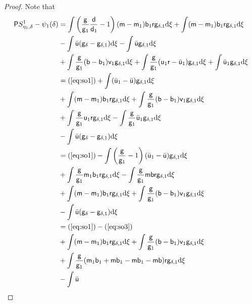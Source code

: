 \begin{proof} Note that
\begin{equation}
  \begin{split}
    \P S_{\eta_1,\delta}^1 -
    \psi_1(\delta)
    & =
      \int\left(\frac{\g}{\g_1}\frac{\d}{\d_1}
      - 1\right)(\m-\m_1)\b_1\r\g_{\delta,1}\dd\xi
      + \int(\m-\m_1)\b_1\r\g_{\delta,1}\dd\xi                                  \\
    & - \int\bar\uu
      (\g_\delta - \g_{\delta,1})\dd\xi - \int \bar\uu
      \g_{\delta,1}\dd\xi                                                       \\
    & +\int
      \frac{\g}{\g_1}(\b-\b_1)\vv_1\g_{\delta,1}\dd\xi
      + \int
      \frac{\g}{\g_1}(\uu_1\r-\bar\uu_1)\g_{\delta,1}\dd\xi
      +\int\bar\uu_1\g_{\delta,1}\dd\xi                                         \\
    & =(\ref{eq:so1})
      +\int (\bar\uu_1-\bar\uu)\g_{\delta,1}\dd\xi                              \\
    & +\int(\m-\m_1)\b_1\r\g_{\delta,1}\dd\xi +
      \int\frac{\g}{\g_1}(\b-\b_1)\vv_1\g_{\delta,1}\dd\xi                      \\
    & + \int
      \frac{\g}{\g_1}\uu_1\r\g_{\delta,1}\dd\xi
      -\int
      \frac{\g}{\g_1}\bar\uu_1\g_{\delta,1}\dd\xi                               \\
    & - \int\bar\uu
      (\g_\delta - \g_{\delta,1})\dd\xi           \\
    & =(\ref{eq:so1})
      -\int\left(\frac{\g}{\g_1}-1\right)(\bar\uu_1-\bar\uu)\g_{\delta,1}\dd\xi \\
    & +\int \frac{\g}{\g_1}\m_1\b_1\r\g_{\delta,1}\dd\xi - \int
      \frac{\g}{\g_1}\m\b\r\g_{\delta,1}\dd\xi                                  \\
    & +\int(\m-\m_1)\b_1\r\g_{\delta,1}\dd\xi +
      \int\frac{\g}{\g_1}(\b-\b_1)\vv_1\g_{\delta,1}\dd\xi                      \\
    & - \int\bar\uu
      (\g_\delta - \g_{\delta,1})\dd\xi           \\
    & =(\ref{eq:so1})-
      (\ref{eq:so3}) \\
    & +\int(\m-\m_1)\b_1\r\g_{\delta,1}\dd\xi +
      \int\frac{\g}{\g_1}(\b-\b_1)\vv_1\g_{\delta,1}\dd\xi            \\
    & +\int
      \frac{\g}{\g_1}(\m_1\b_1
      +\m\b_1-\m\b_1-
      \m\b)\r\g_{\delta,1}\dd\xi                                      \\
    & - \int\bar\uu

\end{split}
\end{equation}
\end{proof}
